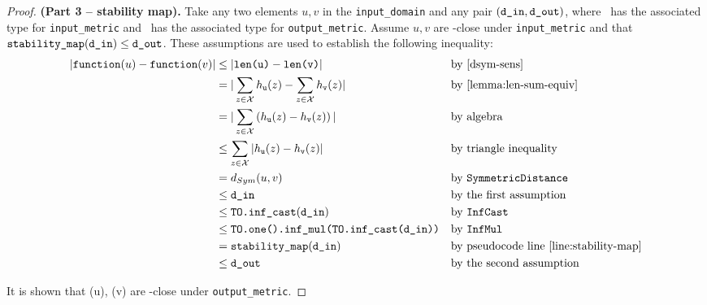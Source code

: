 \documentclass{article}
\begin{document}
\begin{proof} \textbf{(Part 3 -- stability map).} 
    Take any two elements $u, v$ in the \texttt{input\_domain} and any pair $(\texttt{d\_in}, \texttt{d\_out})$, 
    where \din\ has the associated type for \texttt{input\_metric} and \dout\ has the associated type for \texttt{output\_metric}.
    Assume $u, v$ are \din-close under \texttt{input\_metric} and that $\texttt{stability\_map}(\texttt{d\_in}) \leq \texttt{d\_out}$. 
    These assumptions are used to establish the following inequality:
    \begin{align*}
        |\texttt{function}(u) - \texttt{function}(v)| &\leq |\texttt{len(u)} - \texttt{len(v)}| &&\text{by }\ref{dsym-sens} \\
        &= |\sum_{z\in \mathcal{X}} h_{\texttt{u}}(z) - \sum_{z\in \mathcal{X}} h_{\texttt{v}}(z)| &&\text{by } \ref{lemma:len-sum-equiv} \\
        &= |\sum_{z\in \mathcal{X}}\left(h_{\texttt{u}}(z) - h_{\texttt{v}}(z)\right)| &&\text{by algebra} \\
        &\leq \sum_{z\in \mathcal{X}}|h_{\texttt{u}}(z) - h_{\texttt{v}}(z)| &&\text{by triangle inequality} \\
        &= d_{Sym}(u, v) &&\text{by } \texttt{SymmetricDistance}\\
        &\leq \texttt{d\_in} &&\text{by the first assumption} \\
        &\leq \texttt{TO.inf\_cast}(\texttt{d\_in}) &&\text{by } \texttt{InfCast} \\
        &\leq \texttt{TO.one().inf\_mul(TO.inf\_cast(\texttt{d\_in}))} &&\text{by } \texttt{InfMul} \\
        &=\texttt{stability\_map}(\texttt{d\_in}) &&\text{by pseudocode line } \ref{line:stability-map} \\
        &\leq \texttt{d\_out} &&\text{by the second assumption}
    \end{align*}

    It is shown that \function(u), \function(v) are \dout-close under \texttt{output\_metric}.
\end{proof}
\end{document}
